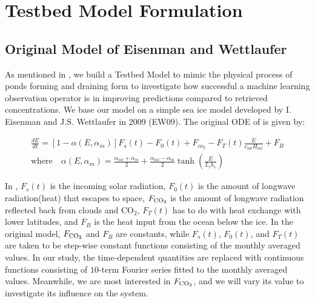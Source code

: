 \chapter{Testbed Model Formulation}\label{ch:formulation}

\section{Original Model of Eisenman and Wettlaufer}
\par As mentioned in , we build a Testbed Model to mimic the physical process of ponds forming and draining form to investigate how successful a machine learning observation operator is in improving predictions compared to retrieved concentrations. We base our model on a simple sea ice model developed by I. Eisenman and J.S. Wettlaufer in 2009 (EW09). The original ODE of \cite{EW09} is given by:

\begin{align}
\frac{dE}{dt}=[1-\alpha(E,\alpha_{m})]F_s(t)-F_0(t)+F_{co_2}-F_T(t)\frac{E}{c_{ml} H_{ml}}+F_B \label{eq:EW09} \\
\textrm{where} \quad \alpha(E,\alpha_m)=\frac{\alpha_{ml}+\alpha_m}{2}+\frac{\alpha_{ml}-\alpha_m}{2}\tanh\left(\frac{E}{L_i h_{c}} \right) \label{eq:alpha}
\end{align}

\par In , $F_s(t)$ is the incoming solar radiation, $F_0(t)$ is the amount of longwave radiation(heat) that escapes to space, $F_{\text{CO}_2}$ is the amount of longwave radiation reflected back from clouds and $\text{CO}_2$, $F_T(t)$ has to do with heat exchange with lower latitudes, and $F_B$ is the heat input from the ocean below the ice. In the original model, $F_{\text{CO}_2}$ and $F_B$ are constants, while $F_s(t)$, $F_0(t)$, and $F_T(t)$ are taken to be step-wise constant functions consisting of the monthly averaged values. In our study, the time-dependent quantities are replaced with continuous functions consisting of $10$-term Fourier series fitted to the monthly averaged values. Meanwhile, we are most interested in $F_{\text{CO}_2}$, and we will vary its value to investigate its influence on the system.

